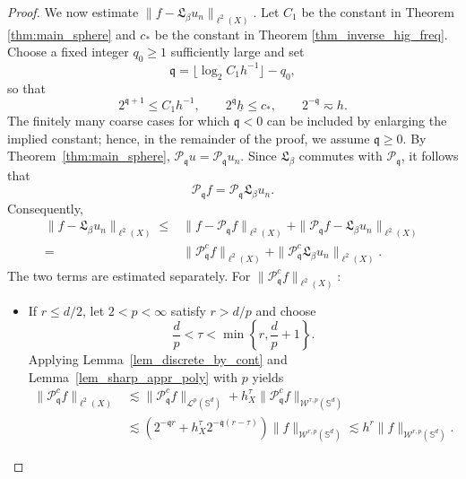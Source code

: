 \documentclass[10pt,a4paper]{amsart}
\def\SS{\mathbb{S}}
\def\mq{\mathfrak{q}}
\def\pc{\mathcal{P}^c}
\begin{document}
\begin{proof}
\medskip
We now estimate $\|f-\mathfrak L_\beta u_n\|_{\ell^2(X)}$. Let $C_1$ be the constant in Theorem \ref{thm:main_sphere} and $c_*$ be the constant in Theorem \ref{thm_inverse_hig_freq}. Choose a fixed integer $q_0\geq1$ sufficiently large and set
\begin{equation*}
    \mq=\lfloor\log_2C_1 h^{-1}\rfloor-q_0,
\end{equation*}
so that
\begin{equation*}
    2^{\mq+1}\leq C_1 h^{-1},\qquad 2^\mq\underline h\leq c_*,\qquad 2^{-\mq}\eqsim h.
\end{equation*}
The finitely many coarse cases for which $\mq<0$ can be included by enlarging the implied constant; hence, in the remainder of the proof, we assume $\mq\geq0$. By Theorem~\ref{thm:main_sphere}, $\mathcal P_\mq u=\mathcal P_\mq u_n$. Since $\mathfrak L_\beta$ commutes with $\mathcal P_\mq$, it follows that
\begin{equation*}
    \mathcal P_\mq f=\mathcal P_\mq\mathfrak L_\beta u_n.
\end{equation*}
Consequently,
\begin{equation}\label{eqn:error_decom3}
    \begin{split}
        \|f-\mathfrak L_\beta u_n\|_{\ell^2(X)}
        \leq&\|f-\mathcal P_\mq f\|_{\ell^2(X)}
        +\|\mathcal P_\mq f-\mathfrak L_\beta u_n\|_{\ell^2(X)}\\
        =&\|\pc_\mq f\|_{\ell^2(X)}
        +\|\pc_\mq\mathfrak L_\beta u_n\|_{\ell^2(X)}.
    \end{split}
\end{equation}
The two terms are estimated separately. For $\|\pc_\mq f\|_{\ell^2(X)}$:
\begin{itemize}
    \item If $r\leq d/2$, let $2<p<\infty$ satisfy $r>d/p$ and choose
\begin{equation*}
    \frac{d}{p}<\tau<\min\left\{r,\frac{d}{p}+1\right\}.
\end{equation*}
Applying Lemma~\ref{lem_discrete_by_cont} and Lemma~\ref{lem_sharp_appr_poly} with $p$ yields
\begin{equation*}
    \begin{split}
        \|\pc_\mq f\|_{\ell^2(X)}
        &\lesssim\|\pc_\mq f\|_{\mathcal L^p(\SS^d)}+h_X^\tau\|\pc_\mq f\|_{\mathcal W^{\tau,p}(\SS^d)}\\
        &\lesssim\left(2^{-\mq r}+h_X^\tau2^{-\mq(r-\tau)}\right)\|f\|_{\mathcal W^{r,p}(\SS^d)}
        \lesssim h^r\|f\|_{\mathcal W^{r,p}(\SS^d)}.

\end{split}
\end{equation*}
\end{itemize}
\end{proof}
\end{document}
